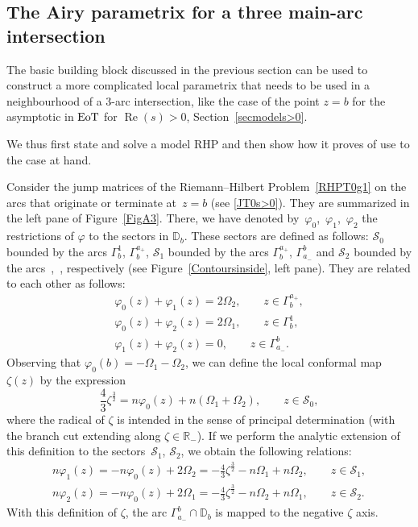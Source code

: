\documentclass[pdftex]{sigma}
\numberwithin{equation}{section}
\theoremstyle{definition}
\def \scr{\mathscr}
\def \DD{\mathbb D}
\def\R{{\mathbb R}}
\def \Re{\operatorname{Re} }
\begin{document}
\subsection{The Airy parametrix for a three main-arc intersection}
\label{SecA3}
The basic building block discussed in the previous section can be used to construct a more complicated local parametrix that needs to be used in a neighbourhood of a $3$-arc intersection, like the case of the point $z=b$ for the asymptotic in ${\rm EoT}$ for $\Re(s)>0$, Section~\ref{secmodels>0}.


We thus first state and solve a model RHP and then show how it proves of use to the case at hand.

Consider the jump matrices of the Riemann--Hilbert Problem~\ref{RHPT0g1} on the arcs that originate or terminate at~${z=b}$ (see \eqref{JT0s>0}). They are summarized in the left pane of Figure~\ref{FigA3}. There, we have denoted by~$\varphi_0$,~$\varphi_1$,~$\varphi_2$ the restrictions of $\varphi$ to the sectors in $\DD_b$. These sectors are defined as follows: $\scr S_0$ bounded by the arcs $\Gamma_b^1$, $\Gamma_b^{a_+}$,
$\scr S_1$ bounded by the arcs $\Gamma_b^{a_+}$, $\Gamma_{a_-}^b$ and
$\scr S_2$ bounded by the arcs~,~, respectively (see Figure~\ref{Contoursinside}, left pane).
They are related to each other as follows:
\begin{gather*}
 \varphi_0(z) + \varphi_1(z) = 2\Omega_2, \qquad z\in \Gamma_{b}^{a_+},\\
 \varphi_0(z) + \varphi_2(z) = 2\Omega_1, \qquad z\in \Gamma_{b}^{1},\\
 \varphi_1(z) + \varphi_2(z) = 0, \qquad z\in \Gamma_{a_-}^{b}.
\end{gather*}
Observing that $\varphi_0(b) = -\Omega_1- \Omega_2 $, we can define the local conformal map $\zeta(z)$ by the expression
\[
\frac 43 \zeta^\frac 32 = n\varphi_0(z) + n(\Omega_1 + \Omega_2), \qquad z\in \scr S_0,
\]
where the radical of $\zeta$ is intended in the sense of principal determination (with the branch cut extending along $\zeta\in \R_-$).
If we perform the analytic extension of this definition to the sectors~$\scr S_1$, $\scr S_2$, we obtain the following relations:
\begin{gather*}
n\varphi_1(z) = -n\varphi_0(z) + 2\Omega_2 =- \frac 43 \zeta^\frac 32 - n\Omega_1 + n\Omega_2,\qquad z\in \scr S_1,\\
n\varphi_2(z) = -n\varphi_0(z) + 2\Omega_1 =- \frac 43 \zeta^\frac 32 - n\Omega_2 + n\Omega_1,\qquad z\in \scr S_2.
\end{gather*}
With this definition of $\zeta$, the arc $\Gamma_{a_-}^b\cap \DD_b$ is mapped to the negative $\zeta$ axis.
\end{document}
